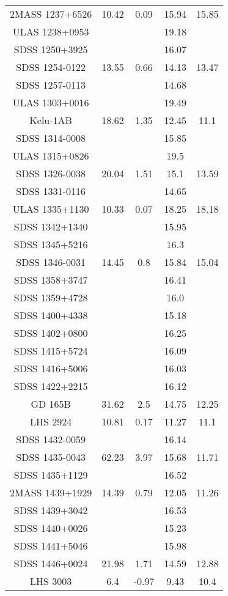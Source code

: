 \begin{table}
\begin{tabular}{ccccc}
2MASS 1237+6526 & 10.42 & 0.09 & 15.94 & 15.85 \\
ULAS 1238+0953 &  &  & 19.18 &  \\
SDSS 1250+3925 &  &  & 16.07 &  \\
SDSS 1254-0122 & 13.55 & 0.66 & 14.13 & 13.47 \\
SDSS 1257-0113 &  &  & 14.68 &  \\
ULAS 1303+0016 &  &  & 19.49 &  \\
Kelu-1AB & 18.62 & 1.35 & 12.45 & 11.1 \\
SDSS 1314-0008 &  &  & 15.85 &  \\
ULAS 1315+0826 &  &  & 19.5 &  \\
SDSS 1326-0038 & 20.04 & 1.51 & 15.1 & 13.59 \\
SDSS 1331-0116 &  &  & 14.65 &  \\
ULAS 1335+1130 & 10.33 & 0.07 & 18.25 & 18.18 \\
SDSS 1342+1340 &  &  & 15.95 &  \\
SDSS 1345+5216 &  &  & 16.3 &  \\
SDSS 1346-0031 & 14.45 & 0.8 & 15.84 & 15.04 \\
SDSS 1358+3747 &  &  & 16.41 &  \\
SDSS 1359+4728 &  &  & 16.0 &  \\
SDSS 1400+4338 &  &  & 15.18 &  \\
SDSS 1402+0800 &  &  & 16.25 &  \\
SDSS 1415+5724 &  &  & 16.09 &  \\
SDSS 1416+5006 &  &  & 16.03 &  \\
SDSS 1422+2215 &  &  & 16.12 &  \\
GD 165B & 31.62 & 2.5 & 14.75 & 12.25 \\
LHS 2924 & 10.81 & 0.17 & 11.27 & 11.1 \\
SDSS 1432-0059 &  &  & 16.14 &  \\
SDSS 1435-0043 & 62.23 & 3.97 & 15.68 & 11.71 \\
SDSS 1435+1129 &  &  & 16.52 &  \\
2MASS 1439+1929 & 14.39 & 0.79 & 12.05 & 11.26 \\
SDSS 1439+3042 &  &  & 16.53 &  \\
SDSS 1440+0026 &  &  & 15.23 &  \\
SDSS 1441+5046 &  &  & 15.98 &  \\
SDSS 1446+0024 & 21.98 & 1.71 & 14.59 & 12.88 \\
LHS 3003 & 6.4 & -0.97 & 9.43 & 10.4 \\

\end{tabular}
\end{table}
